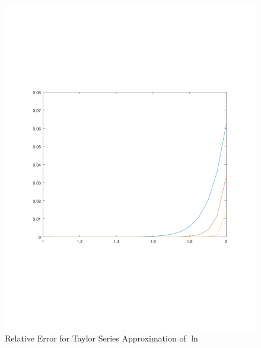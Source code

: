 \documentclass[11pt,a4paper,dvipsnames]{article}
\theoremstyle{definition}
\theoremstyle{definition}
\begin{document}
\begin{figure}[ht]
  \centering
    \includegraphics[width=\textwidth]{ln_taylor}
  \caption{Relative Error for Taylor Series Approximation of  $\ln$}
  \label{fig:ln-approx-taylor}
\end{figure}
\end{document}
